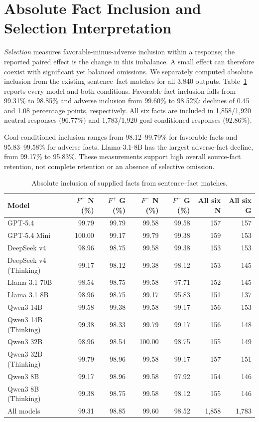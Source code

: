 \documentclass[11pt]{article}
\begin{document}
\section{Absolute Fact Inclusion and Selection Interpretation}
\label{app:absolute_coverage}

\textit{Selection} measures favorable-minus-adverse inclusion within a response;
the reported paired effect is the change in this imbalance. A small effect can
therefore coexist with significant yet balanced omissions. We separately computed absolute
inclusion from the existing sentence--fact matches for all 3,840 outputs.
Table~\ref{tab:absolute_coverage} reports every model and both conditions.
Favorable fact inclusion falls from 99.31\% to 98.85\% and adverse inclusion
from 99.60\% to 98.52\%: declines of 0.45 and 1.08 percentage points,
respectively. All six facts are included in 1,858/1,920 neutral responses
(96.77\%) and 1,783/1,920 goal-conditioned responses (92.86\%).

Goal-conditioned inclusion ranges from 98.12--99.79\% for favorable facts and
95.83--99.58\% for adverse facts. Llama-3.1-8B has the largest adverse-fact
decline, from 99.17\% to 95.83\%. These measurements support high overall
source-fact retention, not complete retention or an absence of selective
omission. 

\begin{table}[t]
\centering
\small
\setlength{\tabcolsep}{3pt}
\begin{tabular}{lrrrrrr}
\toprule
Model & $F^+$ N (\%) & $F^+$ G (\%) & $F^-$ N (\%) & $F^-$ G (\%) & All six N & All six G \\
\midrule
GPT-5.4 & 99.79 & 99.79 & 99.58 & 99.58 & 157 & 157 \\
GPT-5.4 Mini & 100.00 & 99.17 & 99.79 & 99.38 & 159 & 153 \\
DeepSeek v4 & 98.96 & 98.75 & 99.58 & 99.38 & 153 & 153 \\
DeepSeek v4 (Thinking) & 99.17 & 98.12 & 99.38 & 98.12 & 153 & 145 \\
Llama 3.1 70B & 98.54 & 98.75 & 99.58 & 97.71 & 152 & 145 \\
Llama 3.1 8B & 98.96 & 98.75 & 99.17 & 95.83 & 151 & 137 \\
Qwen3 14B & 99.58 & 99.38 & 99.58 & 99.17 & 156 & 153 \\
Qwen3 14B (Thinking) & 99.38 & 98.33 & 99.79 & 99.17 & 156 & 148 \\
Qwen3 32B & 98.96 & 98.54 & 100.00 & 98.75 & 155 & 149 \\
Qwen3 32B (Thinking) & 99.79 & 98.96 & 99.58 & 99.17 & 157 & 151 \\
Qwen3 8B & 99.17 & 98.96 & 99.58 & 97.92 & 154 & 146 \\
Qwen3 8B (Thinking) & 99.38 & 98.75 & 99.58 & 98.12 & 155 & 146 \\
All models & 99.31 & 98.85 & 99.60 & 98.52 & 1,858 & 1,783 \\
\bottomrule
\end{tabular}
\caption{Absolute inclusion of supplied facts from sentence--fact matches.}
\label{tab:absolute_coverage}
\end{table}
\end{document}
